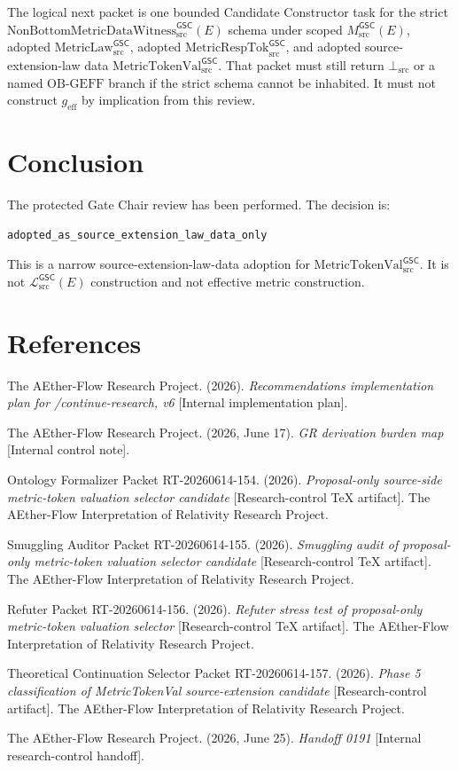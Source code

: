\documentclass[11pt]{article}
\newcommand{\MsrcGSC}{M_{\mathrm{src}}^{\mathsf{GSC}}}
\newcommand{\MetricLaw}{\mathrm{MetricLaw}_{\mathrm{src}}^{\mathsf{GSC}}}
\newcommand{\MetricRespTok}{\mathrm{MetricRespTok}_{\mathrm{src}}^{\mathsf{GSC}}}
\newcommand{\MetricTokenVal}{\mathrm{MetricTokenVal}_{\mathrm{src}}^{\mathsf{GSC}}}
\newcommand{\MetricData}{\mathcal{L}_{\mathrm{src}}^{\mathsf{GSC}}}
\newcommand{\Witness}{\mathrm{NonBottomMetricDataWitness}_{\mathrm{src}}^{\mathsf{GSC}}}
\newcommand{\BottomSrc}{\bot_{\mathrm{src}}}
\newcommand{\OBGEFF}{\mathrm{OB\mbox{-}GEFF}}
\newcommand{\geff}{g_{\mathrm{eff}}}
\begin{document}
The logical next packet is one bounded Candidate Constructor task for the
strict \(\Witness(E)\) schema under scoped \(\MsrcGSC(E)\), adopted
\(\MetricLaw\), adopted \(\MetricRespTok\), and adopted source-extension-law
data \(\MetricTokenVal\). That packet must still return \(\BottomSrc\) or a
named \(\OBGEFF\) branch if the strict schema cannot be inhabited. It must not
construct \(\geff\) by implication from this review.

\section{Conclusion}

The protected Gate Chair review has been performed. The decision is:

\begin{verbatim}
adopted_as_source_extension_law_data_only
\end{verbatim}

This is a narrow source-extension-law-data adoption for
\(\MetricTokenVal\). It is not \(\MetricData(E)\) construction and not
effective metric construction.

\section*{References}

The AEther-Flow Research Project. (2026). \textit{Recommendations
implementation plan for /continue-research, v6} [Internal implementation
plan].

The AEther-Flow Research Project. (2026, June 17). \textit{GR derivation
burden map} [Internal control note].

Ontology Formalizer Packet RT-20260614-154. (2026). \textit{Proposal-only
source-side metric-token valuation selector candidate} [Research-control TeX
artifact]. The AEther-Flow Interpretation of Relativity Research Project.

Smuggling Auditor Packet RT-20260614-155. (2026). \textit{Smuggling audit of
proposal-only metric-token valuation selector candidate} [Research-control
TeX artifact]. The AEther-Flow Interpretation of Relativity Research Project.

Refuter Packet RT-20260614-156. (2026). \textit{Refuter stress test of
proposal-only metric-token valuation selector} [Research-control TeX
artifact]. The AEther-Flow Interpretation of Relativity Research Project.

Theoretical Continuation Selector Packet RT-20260614-157. (2026).
\textit{Phase 5 classification of MetricTokenVal source-extension candidate}
[Research-control artifact]. The AEther-Flow Interpretation of Relativity
Research Project.

The AEther-Flow Research Project. (2026, June 25). \textit{Handoff 0191}
[Internal research-control handoff].
\end{document}
